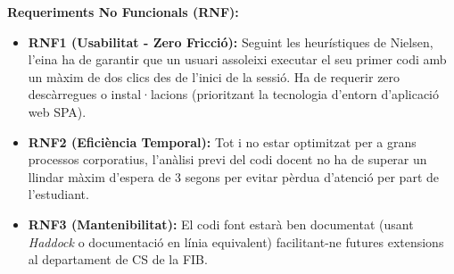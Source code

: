 \textbf{Requeriments No Funcionals (RNF):}
\begin{itemize}
    \item \textbf{RNF1 (Usabilitat - Zero Fricció):} Seguint les heurístiques de Nielsen, l'eina ha de garantir que un usuari assoleixi executar el seu primer codi amb un màxim de dos clics des de l'inici de la sessió. Ha de requerir zero descàrregues o instal·lacions (prioritzant la tecnologia d'entorn d'aplicació web SPA).
    \item \textbf{RNF2 (Eficiència Temporal):} Tot i no estar optimitzat per a grans processos corporatius, l'anàlisi previ del codi docent no ha de superar un llindar màxim d'espera de 3 segons per evitar pèrdua d'atenció per part de l'estudiant.
    \item \textbf{RNF3 (Mantenibilitat):} El codi font estarà ben documentat (usant \textit{Haddock} o documentació en línia equivalent) facilitant-ne futures extensions al departament de CS de la FIB.
\end{itemize}

